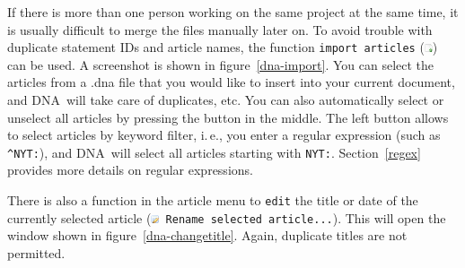 \documentclass[12pt,a4paper]{scrreprt}
\newcommand{\dnashort}{\textsc{DNA}}
\newcommand{\code}[1]{\texttt{#1}}
\begin{document}
If there is more than one person working on the same project at the same time, it is usually difficult to merge the files manually later on. To avoid trouble with duplicate statement IDs and article names, the function \code{import articles} (\includegraphics[height=9px]{icons-import.png}) can be used. A screenshot is shown in figure~\ref{dna-import}. You can select the articles from a .dna file that you would like to insert into your current document, and \dnashort\ will take care of duplicates, etc. You can also automatically select or unselect all articles by pressing the button in the middle. The left button allows to select articles by keyword filter, i.\,e., you enter a regular expression (such as \code{\^{}NYT:}), and \dnashort\ will select all articles starting with \code{NYT:}. Section~\ref{regex} provides more details on regular expressions.

There is also a function in the article menu to \code{edit} the title or date of the currently selected article (\code{\includegraphics[height=9px]{icons-editarticle.png} Rename selected article...}). This will open the window shown in figure~\ref{dna-changetitle}. Again, duplicate titles are not permitted.
\end{document}
